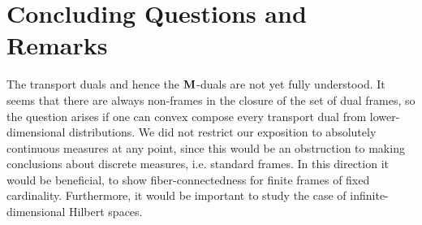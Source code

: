 \documentclass{amsart}
\numberwithin{equation}{section}
\newcommand\cP{{\mathcal P}}
\newcommand\R{{\mathbb R}}
\theoremstyle{plain}
\theoremstyle{definition}
\begin{document}






\section{Concluding Questions and Remarks}
The transport duals and hence the ${\bf M}$-duals are not yet fully understood. It seems that there are always 
non-frames in the closure of the set of dual frames, so the question arises if one can convex compose every transport dual
from lower-dimensional distributions. We did not restrict our exposition to absolutely continuous measures at
any point, since this would be an obstruction to making conclusions about discrete measures, i.e. standard frames. In this direction it 
would be beneficial, to show fiber-connectedness for finite frames of fixed cardinality. 
Furthermore, it would be important to study the case of infinite-dimensional Hilbert spaces.  



\end{document}
